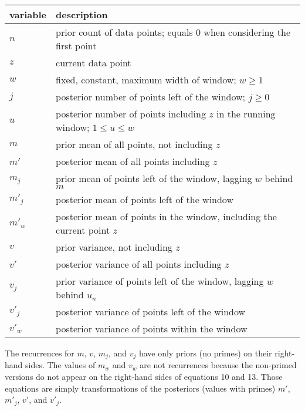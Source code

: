 \documentclass[10pt,oneside,x11names]{article}
\begin{document}
\begin{center}
\begin{tabular}{ll}
variable & description\\
\hline
\(n\) & prior count of data points; equals \(0\) when considering the first point\\
\(z\) & current data point\\
\(w\) & fixed, constant, maximum width of window; \(w\geq{1}\)\\
\(j\) & posterior number of points left of the window; \(j\geq{0}\)\\
\(u\) & posterior number of points including \(z\) in the running window; \(1\leq{u}\leq{w}\)\\
\(m\) & prior mean of all points, not including \(z\)\\
\(m'\) & posterior mean of all points including \(z\)\\
\(m_j\) & prior mean of points left of the window, lagging \(w\) behind \(m\)\\
\(m'_j\) & posterior mean of points left of the window\\
\(m'_w\) & posterior mean of points in the window, including the current point \(z\)\\
\(v\) & prior variance, not including \(z\)\\
\(v'\) & posterior variance of all points including \(z\)\\
\(v_j\) & prior variance of points left of the window, lagging \(w\) behind \(u_n\)\\
\(v'_j\) & posterior variance of points left of the window\\
\(v'_w\) & posterior variance of points within the window\\
\end{tabular}
\end{center}

The recurrences for \(m\), \(v\), \(m_j\), and \(v_j\) have only priors (no
primes) on their right-hand sides. The values of \(m_w\) and \(v_w\) are not
recurrences because the non-primed versions do not appear on the
right-hand sides of equations 10 and 13. Those equations are simply
transformations of the posteriors (values with primes) \(m'\), \(m'_j\),
\(v'\), and \(v'_j\).
\end{document}
